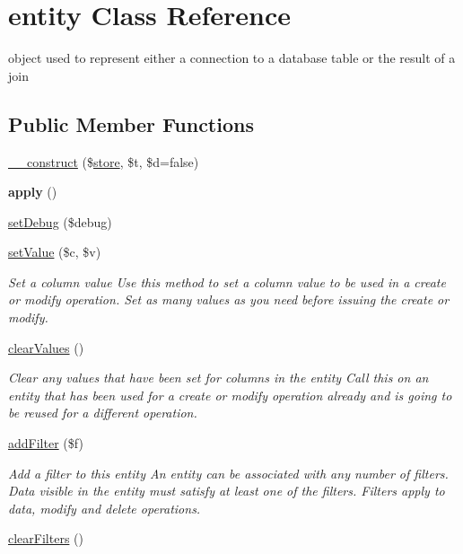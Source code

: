 \hypertarget{classentity}{}\section{entity Class Reference}
\label{classentity}


object used to represent either a connection to a database table or the result of a join  


\subsection*{Public Member Functions}
\begin{DoxyCompactItemize}
\item 
\hyperlink{classentity_a2411a96bf911703bf07e8bac90ffa7f7}{\+\_\+\+\_\+construct} (\$\hyperlink{classstore}{store}, \$t, \$d=false)
\item 
\hypertarget{classentity_ad0ef3e5b12dcd2964ac88226e64851ed}{}{\bfseries apply} ()\label{classentity_ad0ef3e5b12dcd2964ac88226e64851ed}

\item 
\hyperlink{classentity_aa133d346b349c6b0af1566c89234192c}{set\+Debug} (\$debug)
\item 
\hyperlink{classentity_a11cae02dda3cc8b9ad4966e33ef11a2a}{set\+Value} (\$c, \$v)
\begin{DoxyCompactList}\small\item\em Set a column value Use this method to set a column value to be used in a create or modify operation. Set as many values as you need before issuing the create or modify. \end{DoxyCompactList}\item 
\hypertarget{classentity_a7afa5fa5ccc2f9b9a0390cad59ecfede}{}\hyperlink{classentity_a7afa5fa5ccc2f9b9a0390cad59ecfede}{clear\+Values} ()\label{classentity_a7afa5fa5ccc2f9b9a0390cad59ecfede}

\begin{DoxyCompactList}\small\item\em Clear any values that have been set for columns in the entity Call this on an entity that has been used for a create or modify operation already and is going to be reused for a different operation. \end{DoxyCompactList}\item 
\hyperlink{classentity_a7041812e724f4d4e92f7350ac1ca4730}{add\+Filter} (\$f)
\begin{DoxyCompactList}\small\item\em Add a filter to this entity An entity can be associated with any number of filters. Data visible in the entity must satisfy at least one of the filters. Filters apply to data, modify and delete operations. \end{DoxyCompactList}\item 
\hypertarget{classentity_a3c82e6e7a3a2c79306206db541d2a343}{}\hyperlink{classentity_a3c82e6e7a3a2c79306206db541d2a343}{clear\+Filters} ()\label{classentity_a3c82e6e7a3a2c79306206db541d2a343}


\end{DoxyCompactItemize}
